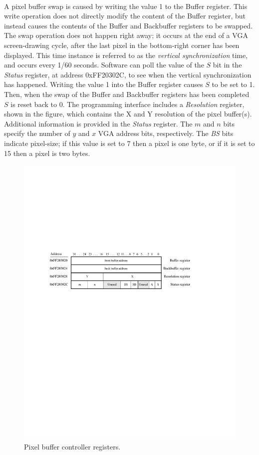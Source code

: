 \documentclass[epsfig,10pt,fullpage]{article}
\begin{document}
~\\
\noindent
A pixel buffer swap is caused by writing the value 1 to the Buffer register. This write
operation does not directly modify the content of the Buffer register, but instead causes
the contents of the Buffer and Backbuffer registers to be swapped. The swap operation does
not happen right away; it occurs at the end of a VGA screen-drawing cycle, after the last 
pixel in the bottom-right corner has been displayed. This time instance is referred to as
the {\it vertical synchronization} time, and occurs every 1/60 seconds. Software can poll the
value of the $S$ bit in the {\it Status} register, at address {\sf 0xFF20302C}, to see when 
the vertical synchronization has happened. Writing the value 1 into the Buffer register
causes $S$ to be set to 1. Then, when the swap of the Buffer and Backbuffer registers 
has been completed $S$ is reset back to 0. The programming interface includes a 
{\it Resolution} register, shown in the figure, which contains the X and Y resolution of 
the pixel buffer(s). Additional information is provided in the {\it Status} register. 
The $m$ and $n$ bits specify the number of $y$ and $x$ VGA address bits, respectively. 
The {\it BS} bits indicate pixel-size; if this value is set to 7 then a pixel is one byte, 
or if it is set to 15 then a pixel is two bytes.

\begin{figure}[h!]
   \begin{center}
       \includegraphics{figures/fig_DMA_ctrl.pdf}
   \end{center}
   \caption{Pixel buffer controller registers.}
	\label{fig:pixel_ctrl}
\end{figure}
\end{document}
